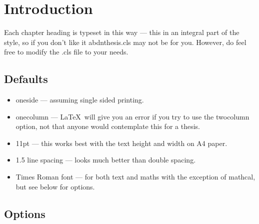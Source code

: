 \chapter[Introduction]{Introduction}
\label{chap:introduction}

Each chapter heading is typeset in this way --- this in an integral
part of the style, so if you don't like it abdnthesis.cls may not be
for you. However, do feel free to modify the .cls file to your needs.

\section{Defaults}

\begin{itemize}
\item oneside --- assuming single sided printing.

\item onecolumn --- \LaTeX\ will give you an error if you try to use
  the twocolumn option, not that anyone would contemplate this for a
  thesis.

\item 11pt --- this works best with the text height and width on A4
  paper.

\item 1.5 line spacing --- looks much better than double spacing.

\item Times Roman font --- for both text and maths with the exception
  of mathcal, but see below for options.
\end{itemize}

\section{Options}

